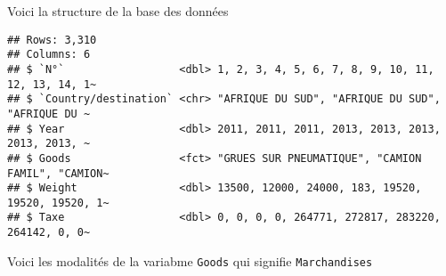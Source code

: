 \documentclass[
]{book}
\begin{document}
Voici la structure de la base des données

\begin{verbatim}
## Rows: 3,310
## Columns: 6
## $ `N°`                  <dbl> 1, 2, 3, 4, 5, 6, 7, 8, 9, 10, 11, 12, 13, 14, 1~
## $ `Country/destination` <chr> "AFRIQUE DU SUD", "AFRIQUE DU SUD", "AFRIQUE DU ~
## $ Year                  <dbl> 2011, 2011, 2011, 2013, 2013, 2013, 2013, 2013, ~
## $ Goods                 <fct> "GRUES SUR PNEUMATIQUE", "CAMION FAMIL", "CAMION~
## $ Weight                <dbl> 13500, 12000, 24000, 183, 19520, 19520, 19520, 1~
## $ Taxe                  <dbl> 0, 0, 0, 0, 264771, 272817, 283220, 264142, 0, 0~
\end{verbatim}

Voici les modalités de la variabme \texttt{Goods} qui signifie
\texttt{Marchandises}
\end{document}
